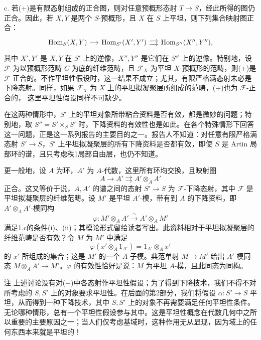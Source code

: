 c. 若(+)是有限态射组成的正合图，则对任意预概形态射 $T\to S$，经此所得的图仍正合。因此，若 $X,Y$ 是两个 $S$-预概形，且 $X$ 在 $S$ 上平坦，则下列集合映射图正合：
\[
\begin{tikzcd}[column sep=small]
\operatorname{Hom}_S(X,Y)\arrow[r]&\operatorname{Hom}_{S'}(X',Y')\arrow[r,shift left=.6ex]\arrow[r,shift right=.6ex]&\operatorname{Hom}_{S''}(X'',Y''),
\end{tikzcd}
\]
其中 $X',Y'$ 是 $X,Y$ 在 $S'$ 上的逆像，$X'',Y''$ 是它们在 $S''$ 上的逆像。特别地，设 $\mathcal F$ 为以预概形范畴 $C$ 为底的纤维范畴，且 $\mathcal F_X$ 为平坦 $X$-预概形的范畴，则(+)是 $\mathcal F$-正合的。不作平坦性假设时，这一结果不成立；尤其，有限严格满态射未必是下降态射。同样，如果 $\mathcal F_X$ 为 $X$ 上的平坦拟凝聚层所组成的范畴，(+)也为 $\mathcal F$-正合的，
这里平坦性假设同样不可缺少。

在这两种情形中，$S'$ 上的平坦对象所带粘合资料是否有效，都是微妙的问题；特别地，取 $S''=S'\times_SS'$ 时，下降资料的有效性也是如此。在各个特殊情形下回答这一问题，正是这一系列报告的主要目的之一。报告人不知道：对任意有限严格满态射 $S'\to S$，$S'$ 上平坦拟凝聚层的所有下降资料是否都有效，即使 $S$ 是 Artin 局部环的谱，且只考虑秩1局部自由层，也仍不知道。

更一般地，设 $A$ 为环，$A'$ 为 $A$-代数，这里所有环均交换，且映射图
\[
A\longrightarrow A'\rightrightarrows A'\otimes_AA'
\]
正合。这又等价于说，$A,A'$ 的谱之间的态射 $S'\to S$ 为 $\mathcal F$-下降态射，其中 $\mathcal F$ 是平坦拟凝聚层的纤维范畴。设 $M'$ 是平坦 $A'$-模，带有到 $A$ 的下降资料，即 $A'\otimes_AA'$-模同构
\[
\varphi:M'\otimes_AA'\xrightarrow{\ \sim\ }A'\otimes_AM'
\]
满足1.c的条件(i)、(ii)；其模论形式留给读者写出。此资料相对于平坦拟凝聚层的纤维范畴是否有效？令 $M$ 为 $M'$ 中满足
\[
\varphi(x'\otimes_A1_{A'})=1_{A'}\otimes_Ax'
\]
的 $x'$ 所组成的集合；这是 $M'$ 的一个 $A$-子模。典范单射 $M\to M'$ 给出 $A'$-模同态 $M\otimes_AA'\to M'$。$\varphi$ 的有效性恰好是说：$M$ 为平坦 $A$-模，且此同态为同构。
\begin{statement}{注}
上述讨论没有对(+)中各态射作平坦性假设；为了得到下降技术，我们不得不对所考虑的 $S,S'$ 上的对象要求平坦性。在后面的第2部分，我们将假设 $\alpha:S'\to S$ 平坦，从而得到一种下降技术，其中 $S,S'$ 上的对象不再需要满足任何平坦性条件。无论哪种情形，总有一个平坦性假设参与其中。这是平坦性概念在代数几何中之所以重要的主要原因之一；当人们仅考虑基域时，这种作用无从显现，因为域上的任何东西本来就是平坦的！
\end{statement}

